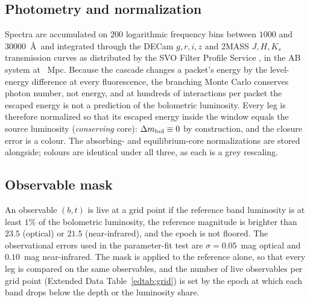\documentclass[11pt]{article}
\begin{document}
\subsection*{Photometry and normalization}
Spectra are accumulated on 200 logarithmic frequency bins between $1000$ and $30000$~\AA\ and integrated through the DECam $g,r,i,z$ and 2MASS $J,H,K_s$ transmission curves \cite{flaugher2015,skrutskie2006} as distributed by the SVO Filter Profile Service \cite{svofps2012,svofps2024}, in the AB system at \Distance\ Mpc. Because the cascade changes a packet's energy by the level-energy difference at every fluorescence, the branching Monte Carlo conserves photon number, not energy, and at hundreds of interactions per packet the escaped energy is not a prediction of the bolometric luminosity. Every leg is therefore normalized so that its escaped energy inside the window equals the source luminosity (\emph{conserving} core): $\Delta m_{\rm bol}\equiv0$ by construction, and the closure error is a colour. The absorbing- and equilibrium-core normalizations are stored alongside; colours are identical under all three, as each is a grey rescaling.

\subsection*{Observable mask}
An observable $(b,t)$ is live at a grid point if the reference band luminosity is at least $1\%$ of the bolometric luminosity, the reference magnitude is brighter than $23.5$ (optical) or $21.5$ (near-infrared), and the epoch is not floored. The observational errors used in the parameter-fit test are $\sigma=0.05$~mag optical and $0.10$~mag near-infrared. The mask is applied to the reference alone, so that every leg is compared on the same observables, and the number of live observables per grid point (Extended Data Table~\ref{edtab:grid}) is set by the epoch at which each band drops below the depth or the luminosity share.  %
\end{document}

